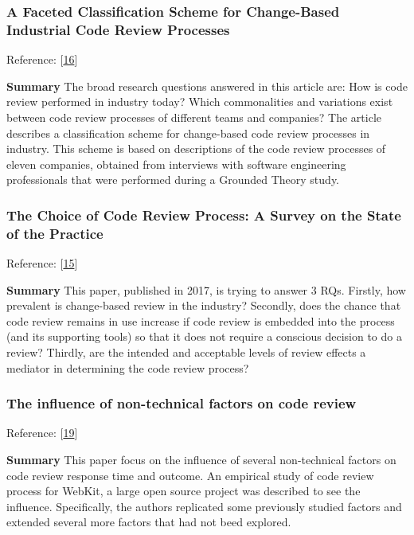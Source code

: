 \documentclass[]{book}
\begin{document}
\subsubsection{A Faceted Classification Scheme for Change-Based
Industrial Code Review
Processes}\label{a-faceted-classification-scheme-for-change-based-industrial-code-review-processes}

Reference: {[}\protect\hyperlink{ref-baum2016faceted}{16}{]}

\textbf{Summary} The broad research questions answered in this article
are: How is code review performed in industry today? Which commonalities
and variations exist between code review processes of different teams
and companies? The article describes a classification scheme for
change-based code review processes in industry. This scheme is based on
descriptions of the code review processes of eleven companies, obtained
from interviews with software engineering professionals that were
performed during a Grounded Theory study.

\subsubsection{The Choice of Code Review Process: A Survey on the State
of the
Practice}\label{the-choice-of-code-review-process-a-survey-on-the-state-of-the-practice}

Reference: {[}\protect\hyperlink{ref-baum2017choice}{15}{]}

\textbf{Summary} This paper, published in 2017, is trying to answer 3
RQs. Firstly, how prevalent is change-based review in the industry?
Secondly, does the chance that code review remains in use increase if
code review is embedded into the process (and its supporting tools) so
that it does not require a conscious decision to do a review? Thirdly,
are the intended and acceptable levels of review effects a mediator in
determining the code review process?

\subsubsection{The influence of non-technical factors on code
review}\label{the-influence-of-non-technical-factors-on-code-review}

Reference: {[}\protect\hyperlink{ref-baysal2013influence}{19}{]}

\textbf{Summary} This paper focus on the influence of several
non-technical factors on code review response time and outcome. An
empirical study of code review process for WebKit, a large open source
project was described to see the influence. Specifically, the authors
replicated some previously studied factors and extended several more
factors that had not beed explored.
\end{document}
